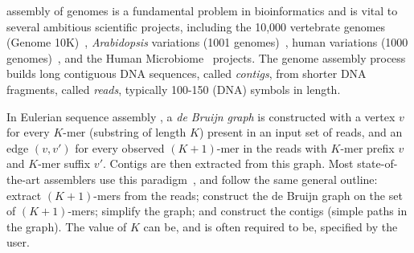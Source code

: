 

% 
% 
% 
% 

 assembly of genomes is a fundamental problem in
bioinformatics and is vital to several ambitious scientific projects, including
the 10,000 vertebrate genomes (Genome 10K)~\cite{Haussler09}, \emph{Arabidopsis}
variations (1001 genomes)~\cite{Ossowski08}, human variations (1000
genomes)~\cite{Abecasis12}, and the Human Microbiome~\cite{hmp} projects. The
genome assembly process builds long contiguous DNA sequences, called {\em
contigs}, from shorter DNA fragments, called {\em reads}, typically 100-150
(DNA) symbols in length.


In Eulerian sequence assembly \cite{IW95,PTW}, a {\em de Bruijn graph} is
constructed with a vertex $v$ for every $K$-mer (substring of length $K$)
present in an input set of reads, and an edge $(v, v')$ for every observed $(K +
1)$-mer in the reads with $K$-mer prefix $v$ and $K$-mer suffix $v'$.  Contigs
are then extracted from this graph.  Most state-of-the-art assemblers use this
paradigm~\cite{bankevich2012spades,peng2010idba,Li:2010,Simpson:2009,Butler:2008}, 
and follow the same general outline: extract $(K + 1)$-mers from the reads;
construct the de Bruijn graph on the set of $(K +1)$-mers; simplify the graph; 
and construct the contigs (simple paths in the graph). The value of $K$ can be,
and is often required to be, specified by the user.

